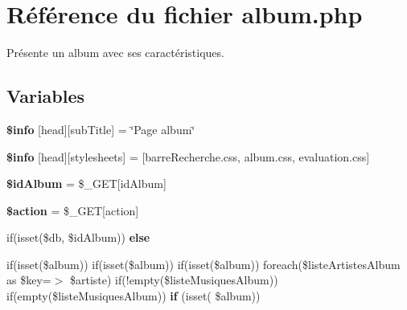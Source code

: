 \hypertarget{album_8php}{}\section{Référence du fichier album.\+php}
\label{album_8php}


Présente un album avec ses caractéristiques.  


\subsection*{Variables}
\begin{DoxyCompactItemize}
\item 
\mbox{\label{album_8php_a024f87f9bf4f3b33710e2e7ff8f60823}} 
{\bfseries \$info} \mbox{[}\textquotesingle{}head\textquotesingle{}\mbox{]}\mbox{[}\textquotesingle{}sub\+Title\textquotesingle{}\mbox{]} = \char`\"{}Page album\char`\"{}
\item 
\mbox{\label{album_8php_af6044c8bf78ebc8c58057e14d7738bbd}} 
{\bfseries \$info} \mbox{[}\textquotesingle{}head\textquotesingle{}\mbox{]}\mbox{[}\textquotesingle{}stylesheets\textquotesingle{}\mbox{]} = \mbox{[}\textquotesingle{}barre\+Recherche.\+css\textquotesingle{}, \textquotesingle{}album.\+css\textquotesingle{}, \textquotesingle{}evaluation.\+css\textquotesingle{}\mbox{]}
\item 
\mbox{\label{album_8php_a72867a182874faddb69d6feb58ce5c00}} 
{\bfseries \$id\+Album} = \$\+\_\+\+G\+ET\mbox{[}\textquotesingle{}id\+Album\textquotesingle{}\mbox{]}
\item 
\mbox{\label{album_8php_aa698a3e72116e8e778be0e95d908ee30}} 
{\bfseries \$action} = \$\+\_\+\+G\+ET\mbox{[}\textquotesingle{}action\textquotesingle{}\mbox{]}
\item 
if(isset(\$db, \$id\+Album)) {\bfseries else}
\item 
\mbox{\label{album_8php_af91466b0d42f28e793feb9d4afab33d1}} 
if(isset(\$album)) if(isset(\$album)) if(isset(\$album)) foreach(\$liste\+Artistes\+Album as \$key=$>$ \$artiste) if(!empty(\$liste\+Musiques\+Album)) if(empty(\$liste\+Musiques\+Album)) {\bfseries if} (isset( \$album))
\end{DoxyCompactItemize}


